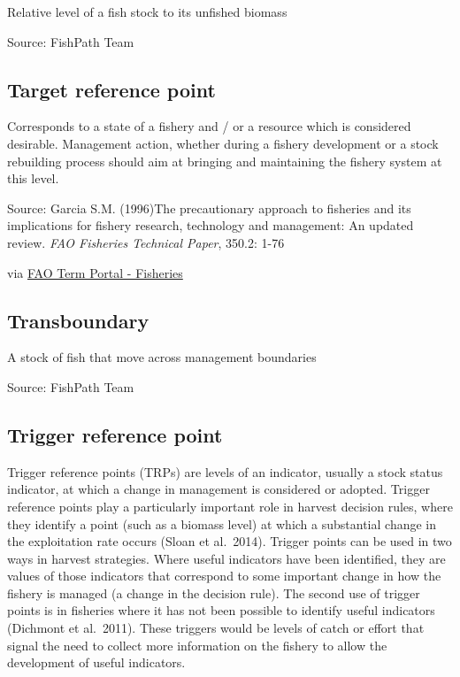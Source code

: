 \documentclass[
  11pt,
]{book}
\begin{document}
Relative level of a fish stock to its unfished biomass

Source: FishPath Team

\hypertarget{target-reference-point}{%
\subsection{Target reference point}\label{target-reference-point}}

Corresponds to a state of a fishery and / or a resource which is considered desirable. Management action, whether during a fishery development or a stock rebuilding process should aim at bringing and maintaining the fishery system at this level.

Source: Garcia S.M. (1996)The precautionary approach to fisheries and its implications for fishery research, technology and management: An updated review. \emph{FAO Fisheries Technical Paper}, 350.2: 1-76

via \href{http://www.fao.org/fishery/glossary/en}{FAO Term Portal - Fisheries}

\hypertarget{transboundary}{%
\subsection{Transboundary}\label{transboundary}}

A stock of fish that move across management boundaries

Source: FishPath Team

\hypertarget{trigger-reference-point}{%
\subsection{Trigger reference point}\label{trigger-reference-point}}

Trigger reference points (TRPs) are levels of an indicator, usually a stock status indicator, at which a change in management is considered or adopted. Trigger reference points play a particularly important role in harvest decision rules, where they identify a point (such as a biomass level) at which a substantial change in the exploitation rate occurs (Sloan et al.~2014). Trigger points can be used in two ways in harvest strategies. Where useful indicators have been identified, they are values of those indicators that correspond to some important change in how the fishery is managed (a change in the decision rule). The second use of trigger points is in fisheries where it has not been possible to identify useful indicators (Dichmont et al.~2011). These triggers would be levels of catch or effort that signal the need to collect more information on the fishery to allow the development of useful indicators.
\end{document}
